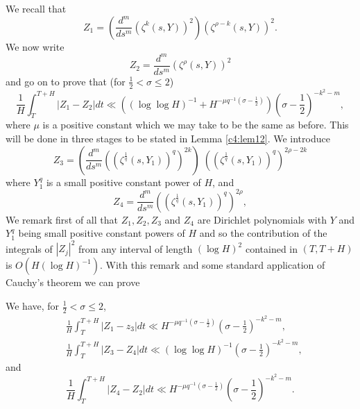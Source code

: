 We recall that\pageoriginale 
$$
Z_1 = \left(\frac{d^m}{ds^m} (\zeta^k (s,Y))^2\right) (\zeta^{\rho-k} (s,Y))^2. 
$$
We now write
\begin{equation*}
Z_2 = \frac{d^m}{ds^m} (\zeta^\rho (s,Y))^2 \tag{4.2.17}\label{c4:eq4.2.17}
\end{equation*}
and go on to prove that (for $\frac{1}{2} < \sigma \leq 2$)
\begin{equation*}
\frac{1}{H} \int^{T+H}_T |Z_1 -Z_2| dt \ll \left((\log \log H)^{-1} + H^{-\mu q^{-1} (\sigma -\frac{1}{2})} \right) \left(\sigma -\frac{1}{2}\right)^{-k^2 - m}, \tag{4.2.18}\label{c4:eq4.2.18}
\end{equation*}
where $\mu$ is a positive constant which we may take to be the same as before. This will be done in three stages to be stated in Lemma \ref{c4:lem12}. We introduce
\begin{equation*}
Z_3 = \left( \frac{d^m}{ds^m} \left( \left( \zeta^{\frac{1}{q}} (s, Y_1)\right)^q\right)^{2k}\right) \; \left( \left(\zeta^{\frac{1}{q}} (s,Y_1)\right)^q\right)^{2\rho- 2k}  \tag{4.2.19}\label{c4:eq4.2.19}
\end{equation*}
where $Y^q_1$ is a small positive constant power of $H$, and 
\begin{equation*}
Z_4 =\frac{d^m}{ds^m} \left(  \left(\zeta^{\frac{1}{q}} (s, Y_1) \right)^q\right)^{2\rho}, 
\tag{4.2.20}\label{c4:eq4.2.20}
\end{equation*}
We remark first of all that $Z_1, Z_2, Z_3$ and $Z_4$ are Dirichlet polynomials with $Y$ and $Y^q_1$ being small positive constant powers of $H$ and so the contribution of the integrals of $|Z_j|^2$ from any interval of length $(\log H)^2$ contained in $(T, T + H) $ is $O(H(\log H)^{-1})$. With this remark and some standard application of Cauchy's theorem we can prove

\begin{lem}\label{c4:lem12}
We have, for $\frac{1}{2} < \sigma \leq 2$,
\begin{align*}
& \frac{1}{H} \int^{T+H}_T |Z_1 - z_3| dt \ll H^{-\mu q^{-1} (\sigma -\frac{1}{2})} \left(\sigma -\frac{1}{2} \right)^{-k^2 -m},  \tag{4.2.21}\label{c4:eq4.2.21}\\
& \frac{1}{H} \int^{T+H}_T |Z_3 - Z_4| dt \ll (\log \log H)^{-1} \left(\sigma -\frac{1}{2} \right)^{-k^2 -m},  \tag{4.2.22}\label{c4:eq4.2.22}
\end{align*}
and\pageoriginale
\begin{equation*}
\frac{1}{H} \int^{T+H}_T |Z_4 - Z_2| dt \ll H^{-\mu q^{-1} (\sigma -\frac{1}{2})} \left(\sigma - \frac{1}{2} \right)^{-k^2-m} . \tag{4.2.23}\label{c4:eq4.2.23}
\end{equation*}
\end{lem}

